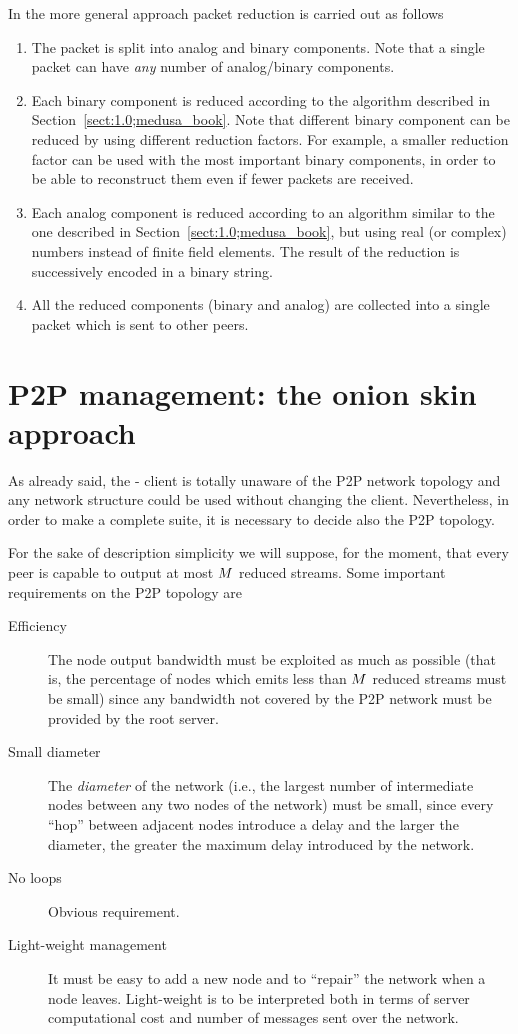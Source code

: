 \documentclass{medusabook}
\begin{document}
In the more general approach packet reduction is carried out as
follows

\begin{enumerate}
\item
The packet is split into analog and binary components.  Note that a
single packet can have \emph{any} number of analog/binary components.
\item
Each binary component is reduced according to the algorithm described
in Section~\ref{sect:1.0;medusa_book}.  Note that different binary
component can be reduced by using different reduction factors.  For
example, a smaller reduction factor can be used with the most
important binary components, in order to be able to reconstruct them
even if fewer packets are received.
\item
Each analog component is reduced according to an algorithm similar to
the one described in Section~\ref{sect:1.0;medusa_book}, but using
real (or complex) numbers instead of finite field elements.  The
result of the reduction is successively encoded in a binary string.
\item
All the reduced components (binary and analog) are collected into a
single packet which is sent to other peers.
\end{enumerate}
%

\section{P2P management: the onion skin approach}
\label{sect:1.1;medusa_book}

As already said, the \medusa- client is totally unaware of the P2P
network topology and any network structure could be used without
changing the client.  Nevertheless, in order to make a complete suite,
it is necessary to decide also the P2P topology.

For the sake of description simplicity we will suppose, for the
moment, that every peer is capable to output at most $M$
reduced streams.  Some important requirements on the P2P
topology are

\begin{description}
  \item[Efficiency] The node output bandwidth must be exploited as
  much as possible (that is, the percentage of nodes which emits less than
  $M$ reduced streams must be small) since any bandwidth not
  covered by the P2P network must be provided by the root server.
  \item[Small diameter] The \emph{diameter} of the network (i.e., the
  largest number of intermediate nodes between any two nodes of the
  network) must be small, since every ``hop'' between adjacent nodes
  introduce a delay and the larger the diameter, the greater the
  maximum delay introduced by the network.
  \item[No loops] Obvious requirement.
  \item[Light-weight management] It must be easy to add a new node and
  to ``repair'' the network when a node leaves.  Light-weight is to be
  interpreted both in terms of server computational cost and number of
  messages sent over the network.
\end{description}
\end{document}

